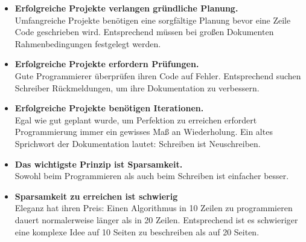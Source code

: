 \documentclass[a4paper,titlepage=true,twoside]{scrartcl}
\newcommand{\gquote}[1]{\glqq #1\grqq}
\newcommand{\itemtitle}[1]{\textbf{#1}}
\begin{document}
\begin{small}
\begin{itemize}
 \item \itemtitle{Erfolgreiche Projekte verlangen gründliche Planung.} \\
  Umfangreiche Projekte benötigen eine sorgfältige Planung bevor eine Zeile Code
geschrieben wird. Entsprechend müssen bei großen Dokumenten Rahmenbedingungen
festgelegt werden.
 \item \itemtitle{Erfolgreiche Projekte erfordern Prüfungen.} \\
Gute Programmierer überprüfen ihren Code auf Fehler. Entsprechend suchen
Schreiber Rückmeldungen, um ihre Dokumentation zu verbessern.
 \item \itemtitle{Erfolgreiche Projekte benötigen Iterationen.} \\
Egal wie gut geplant wurde, um Perfektion zu erreichen erfordert Programmierung
immer ein gewisses Maß an Wiederholung. Ein altes Sprichwort der Dokumentation
lautet: \gquote{Schreiben ist Neuschreiben}.
 \item \itemtitle{Das wichtigste Prinzip ist Sparsamkeit.} \\
Sowohl beim Programmieren als auch beim Schreiben ist einfacher besser.
 \item \itemtitle{Sparsamkeit zu erreichen ist schwierig} \\
Eleganz hat ihren Preis: Einen Algorithmus in 10 Zeilen zu programmieren dauert
normalerweise länger als in 20 Zeilen. Entsprechend ist es schwieriger eine
komplexe Idee auf 10 Seiten zu beschreiben als auf 20 Seiten.
\end{itemize}
\end{small}
\end{document}
